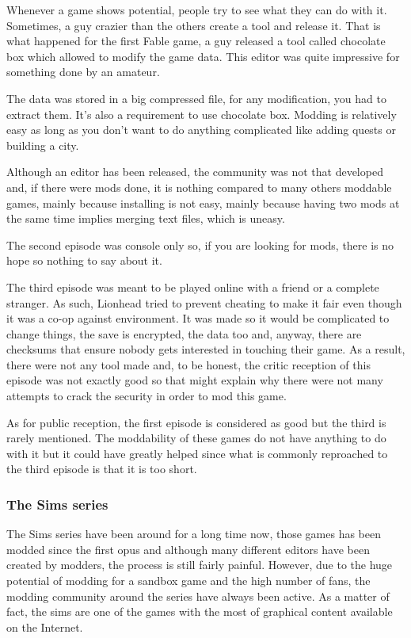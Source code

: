 \documentclass[a4paper,12pt]{article}
\begin{document}
Whenever a game shows potential, people try to see what they can do with it. Sometimes, a guy crazier than the others create a tool and release it. That is what happened for the first Fable game, a guy released a tool called chocolate box which allowed to modify the game data. This editor was quite impressive for something done by an amateur.

The data was stored in a big compressed file, for any modification, you had to extract them. It's also a requirement to use chocolate box. Modding is relatively easy as long as you don't want to do anything complicated like adding quests or building a city.

Although an editor has been released, the community was not that developed and, if there were mods done, it is nothing compared to many others moddable games, mainly because installing is not easy, mainly because having two mods at the same time implies merging text files, which is uneasy.

The second episode was console only so, if you are looking for mods, there is no hope so nothing to say about it.

The third episode was meant to be played online with a friend or a complete stranger. As such, Lionhead tried to prevent cheating to make it fair even though it was a co-op against environment. It was made so it would be complicated to change things, the save is encrypted, the data too and, anyway, there are checksums that ensure nobody gets interested in touching their game. As a result, there were not any tool made and, to be honest, the critic reception of this episode was not exactly good so that might explain why there were not many attempts to crack the security in order to mod this game.

As for public reception, the first episode is considered as good but the third is rarely mentioned. The moddability of these games do not have anything to do with it but it could have greatly helped since what is commonly reproached to the third episode is that it is too short.

\subsubsection{The Sims series}

The Sims series have been around for a long time now, those games has been modded since the first opus and although many different editors have been created by modders, the process is still fairly painful. However, due to the huge potential of modding for a sandbox game and the high number of fans, the modding community around the series have always been active. As a matter of fact, the sims are one of the games with the most of graphical content available on the Internet.
\end{document}
